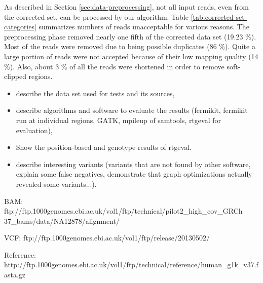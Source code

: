 As described in Section \ref{sec:data-preprocessing}, not all input reads, even from the corrected set, can be processed by our algorithm. Table \ref{tab:corrected-set-categories} summarizes numbers of reads unacceptable for various reasons. The preprocessing phase removed nearly one fifth of the corrected data set (19.23 \%). Most of the reads were removed due to being possible duplicates (86 \%). Quite a large portion of  reads were not accepted because of their low mapping quality (14 \%). Also, about 3 \% of all the reads were shortened in order to remove soft-clipped regions.

\begin{itemize}
\item describe the data set used for tests and its sources,
\item describe algorithms and software to evaluate the results (fermikit, fermikit run at individual regions, GATK, mpileup of samtools, rtgeval for evaluation),
\item Show the position-based and genotype results of rtgeval.
\item describe interesting variants (variants that are not found by other software, explain some false negatives, demonstrate that graph optimizations actually revealed some variants...).
\end{itemize}

BAM:
ftp://ftp.1000genomes.ebi.ac.uk/vol1/ftp/technical/pilot2_high_cov_GRCh
37_bams/data/NA12878/alignment/

VCF:
ftp://ftp.1000genomes.ebi.ac.uk/vol1/ftp/release/20130502/

Reference:
http://ftp.1000genomes.ebi.ac.uk/vol1/ftp/technical/reference/human_g1k_v37.fasta.gz



